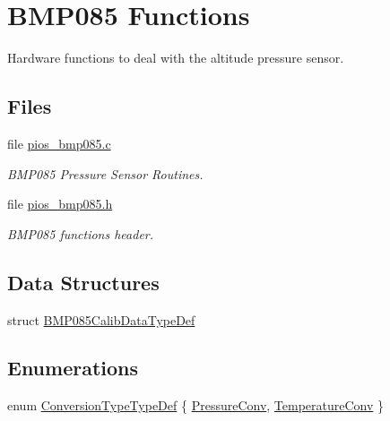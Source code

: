 \hypertarget{group___p_i_o_s___b_m_p085}{\section{B\-M\-P085 Functions}
\label{group___p_i_o_s___b_m_p085}
}


Hardware functions to deal with the altitude pressure sensor.  


\subsection*{Files}
\begin{DoxyCompactItemize}
\item 
file \hyperlink{pios__bmp085_8c}{pios\-\_\-bmp085.\-c}
\begin{DoxyCompactList}\small\item\em B\-M\-P085 Pressure Sensor Routines. \end{DoxyCompactList}\item 
file \hyperlink{pios__bmp085_8h}{pios\-\_\-bmp085.\-h}
\begin{DoxyCompactList}\small\item\em B\-M\-P085 functions header. \end{DoxyCompactList}\end{DoxyCompactItemize}
\subsection*{Data Structures}
\begin{DoxyCompactItemize}
\item 
struct \hyperlink{struct_b_m_p085_calib_data_type_def}{B\-M\-P085\-Calib\-Data\-Type\-Def}
\end{DoxyCompactItemize}
\subsection*{Enumerations}
\begin{DoxyCompactItemize}
\item 
enum \hyperlink{group___p_i_o_s___b_m_p085_ga9cea215e6c64f123b3561819d5219785}{Conversion\-Type\-Type\-Def} \{ \hyperlink{group___p_i_o_s___b_m_p085_gga9cea215e6c64f123b3561819d5219785a6c9b0031c635c5a250f3a723965c4afd}{Pressure\-Conv}, 
\hyperlink{group___p_i_o_s___b_m_p085_gga9cea215e6c64f123b3561819d5219785addc6f7404843f7109baf6db614596ed0}{Temperature\-Conv}
 \}
\end{DoxyCompactItemize}
